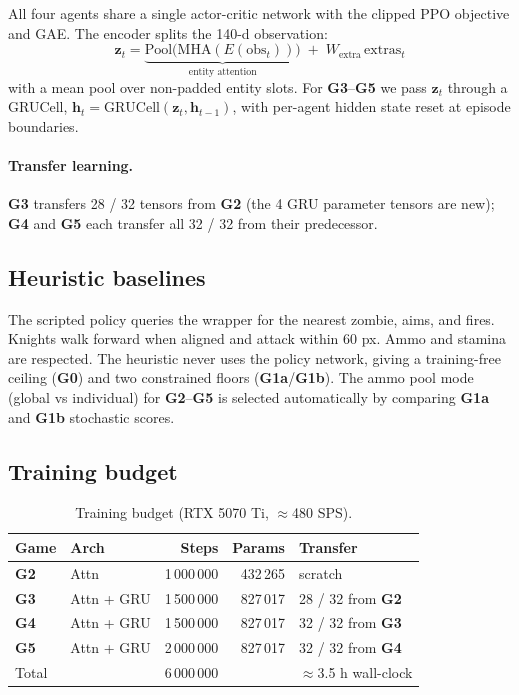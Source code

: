 \documentclass[11pt,a4paper]{article}
\newcommand{\gz}{\textbf{G0}}
\newcommand{\ga}{\textbf{G1a}}
\newcommand{\gb}{\textbf{G1b}}
\newcommand{\gii}{\textbf{G2}}
\newcommand{\giii}{\textbf{G3}}
\newcommand{\giv}{\textbf{G4}}
\newcommand{\gv}{\textbf{G5}}
\begin{document}
All four agents share a single actor-critic network with the clipped PPO
objective and GAE. The encoder splits the 140-d observation:
\[
\mathbf{z}_t = \underbrace{\mathrm{Pool}\bigl(\mathrm{MHA}(E(\mathrm{obs}_t))\bigr)}_{\text{entity attention}}
\;+\; W_{\text{extra}}\,\mathrm{extras}_t
\]
with a mean pool over non-padded entity slots. For \giii--\gv{} we pass
$\mathbf{z}_t$ through a GRUCell,
$\mathbf{h}_t = \mathrm{GRUCell}(\mathbf{z}_t, \mathbf{h}_{t-1})$,
with per-agent hidden state reset at episode boundaries.

\paragraph{Transfer learning.} \giii{} transfers 28 / 32 tensors from
\gii{} (the 4 GRU parameter tensors are new); \giv{} and \gv{} each
transfer all 32 / 32 from their predecessor.

\subsection{Heuristic baselines}

The scripted policy queries the wrapper for the nearest zombie, aims,
and fires. Knights walk forward when aligned and attack within 60 px.
Ammo and stamina are respected. The heuristic never uses the policy
network, giving a training-free ceiling (\gz{}) and two constrained
floors (\ga/\gb{}). The ammo pool mode (global vs individual) for
\gii--\gv{} is selected automatically by comparing \ga{} and \gb{}
stochastic scores.

\subsection{Training budget}

\begin{table}[H]
\centering
\caption{Training budget (RTX 5070 Ti, $\approx$480 SPS).}
\label{tab:budget}
\small
\begin{tabular}{@{}llrrl@{}}
\toprule
\textbf{Game} & \textbf{Arch} & \textbf{Steps} & \textbf{Params} & \textbf{Transfer} \\
\midrule
\gii{}   & Attn        & 1\,000\,000 & 432\,265 & scratch \\
\giii{}  & Attn + GRU  & 1\,500\,000 & 827\,017 & 28 / 32 from \gii{} \\
\giv{}   & Attn + GRU  & 1\,500\,000 & 827\,017 & 32 / 32 from \giii{} \\
\gv{}    & Attn + GRU  & 2\,000\,000 & 827\,017 & 32 / 32 from \giv{} \\
\midrule
Total    &             & 6\,000\,000 &          & $\approx$3.5 h wall-clock \\
\bottomrule
\end{tabular}
\end{table}
\end{document}
